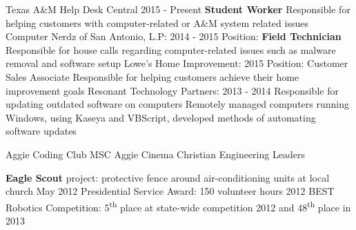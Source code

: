 \documentclass[12pt]{article}
\begin{document}
\begin{flushleft}
\begin{outline}[compactitem]
	\1 Texas A\&M Help Desk Central \hfill 2015 - Present
		\2 \textbf{Student Worker}
		\2 Responsible for helping customers with computer-related or A\&M system related issues
	\1 Computer Nerdz of San Antonio, L.P: \hfill 2014 - 2015
		\2 Position: \textbf{Field Technician}
		\2 Responsible for house calls regarding computer-related issues such as malware removal and software setup
	\1 Lowe's Home Improvement: \hfill 2015
		\2 Position: Customer Sales Associate
		\2 Responsible for helping customers achieve their home improvement goals
	\1 Resonant Technology Partners: \hfill 2013 - 2014
		\2 Responsible for updating outdated software on computers
		\2 Remotely managed computers running Windows, using Kaseya and VBScript, developed methods of automating software updates

	\1 Aggie Coding Club \hfill{}\hspace{1px} MSC Aggie Cinema \hfill{}\hspace{1px} Christian Engineering Leaders

	\1 \textbf{Eagle Scout} project: protective fence around air-conditioning units at local church \hfill May 2012
	\1 Presidential Service Award: 150 volunteer hours \hfill 2012
	\1 BEST Robotics Competition: 5\textsuperscript{th} place at state-wide competition 2012 and 48\textsuperscript{th} place in 2013

\end{outline}
\end{flushleft}
\end{document}
